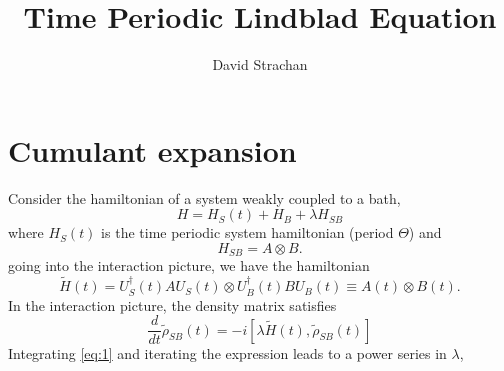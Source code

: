 \documentclass[10pt]{article}
\numberwithin{equation}{section}
\begin{document}
\author{David Strachan}
\title{\textbf{Time Periodic Lindblad Equation}}

\maketitle
\section{Cumulant expansion}
Consider the hamiltonian of a system weakly coupled to a bath,
\begin{equation}
H = H_{S}(t) + H_{B} + \lambda H_{SB} 
\end{equation}
where $H_{S}(t)$ is the time periodic system hamiltonian (period $\Theta$) and
\begin{equation}
H_{SB} = A\otimes B.
\end{equation}
going into the interaction picture, we have the hamiltonian 
\begin{equation}
\tilde{H}(t) = U^{\dagger}_{S}(t)AU_{S}(t)\otimes U^{\dagger}_{B}(t)BU_{B}(t) \equiv A(t) \otimes B(t).
\end{equation}
In the interaction picture, the density matrix satisfies 
\begin{equation} \label{eq:1}
\frac{d}{dt}\tilde{\rho}_{SB}(t) = -i[\lambda\tilde{H}(t),\tilde{\rho}_{SB}(t)]
\end{equation}
Integrating \ref{eq:1} and iterating the expression leads to a power series in $\lambda$,
\end{document}
